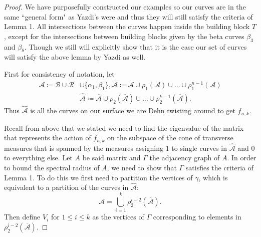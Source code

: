 \begin{proof}
We have purposefully constructed our examples so our curves are in the same ``general form" as Yazdi's were and thus they will still satisfy the criteria of Lemma 1. All intersections between the curves happen inside the building block $T$, except for the intersections between building blocks given by the beta curves $\beta_3$ and $\beta_8$. Though we still will explicitly show that it is the case our set of curves will satisfy the above lemma by Yazdi as well.

First for consistency of notation, let
\begin{align*}
    \mathcal{A} \coloneqq \mathcal{B} \cup \mathcal{R} &\cup \{\alpha_1,\beta_1\}, \overline{\mathcal{A}} \coloneqq \mathcal{A} \cup \rho_1(\mathcal{A}) \cup \dots \cup \rho_1^{n-1}(\mathcal{A}) \\
    &\hat{\mathcal{A}} \coloneqq \overline{\mathcal{A}} \cup \rho_2(\overline{\mathcal{A}}) \cup \dots \cup \rho_2^{k-1}(\overline{\mathcal{A}}).
\end{align*}
Thus $\hat{\mathcal{A}}$ is all the curves on our surface we are Dehn twisting around to get $f_{n,k}$.

Recall from above that we stated we need to find the eigenvalue of the matrix that represents the action of $f_{n,k}$ on the subspace of the cone of transverse measures that is spanned by the measures assigning $1$ to single curves in $\hat{\mathcal{A}}$ and 0 to everything else. Let $A$ be said matrix and $\Gamma$ the adjacency graph of $A$. In order to bound the spectral radius of $A$, we need to show that $\Gamma$ satisfies the criteria of Lemma 1. To do this we first need to partition the vertices of $\gamma$, which is equivalent to a partition of the curves in $\hat{\mathcal{A}}$: $$\mathcal{A} = \bigcup_{i=1}^k \rho_2^{i-2}(\overline{\mathcal{A}}).$$ Then define $V_i$ for $1 \leq i \leq k$ as the vertices of $\Gamma$ corresponding to elements in $\rho_2^{i-2}(\overline{\mathcal{A}})$.


\end{proof}
